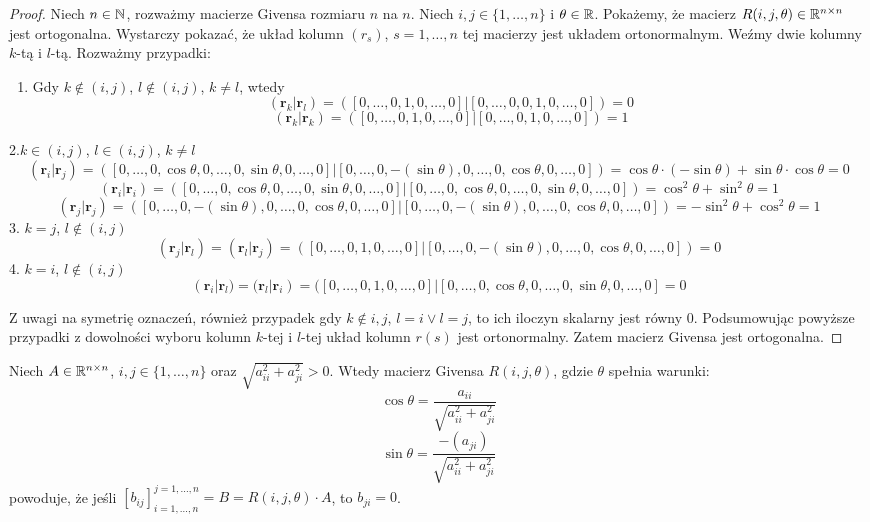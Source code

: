 \documentclass[12pt,a4paper]{report}
\newcommand{\vr}[1]{\mathbf{#1}}
\newcommand{\mx}[1]{{#1}}
\begin{document}
\begin{proof}
Niech $n\in \mathbb{N}$, rozważmy macierze Givensa rozmiaru $n$ na $n$. Niech $i,j \in \{1,\ldots, n\}$ i $\theta \in \mathbb{R}$. Pokażemy, że macierz $\mx{R}(i,j,\theta) \in \setR^{n\times n}$ jest ortogonalna.
Wystarczy pokazać, że układ kolumn $(r_s)$, $s=1,\ldots, n$ tej macierzy jest układem ortonormalnym. Weźmy dwie kolumny $k$-tą i $l$-tą. Rozważmy przypadki:
\begin{enumerate}
\item Gdy $k\notin (i,j)$, $l\notin (i,j)$, $k \neq l$, wtedy
$$
(\vr{r}_{k}|\vr{r}_{l}) = ([0,\ldots, 0,1,0,\ldots,0]|[0,\ldots,0,0,1,0,\ldots,0]) = 0
$$
$$
(\vr{r}_{k}|\vr{r}_{k}) = ([0,\ldots, 0,1,0,\ldots,0]|[0,\ldots,0,1,0,\ldots,0]) = 1
$$
\end{enumerate}

2.$k \in (i,j)$, $l \in (i,j)$, $k \neq l$
{\scriptsize
$$
(\vr{r}_{i}|\vr{r}_{j}) = ([0,\ldots, 0,\cos\theta,0,\ldots,0,\sin\theta,0,\ldots,0]|[0,\ldots, 0,-(\sin\theta),0,\ldots,0,\cos\theta,0,\ldots,0]) = \cos\theta\cdot(-\sin\theta) + \sin\theta\cdot\cos\theta = 0
$$
$$
(\vr{r}_{i}|\vr{r}_{i}) = ([0,\ldots, 0,\cos\theta,0,\ldots,0,\sin\theta,0,\ldots,0]|[0,\ldots, 0,\cos\theta,0,\ldots,0,\sin\theta,0,\ldots,0]) = \cos^{2}\theta + \sin^{2}\theta = 1
$$
$$
(\vr{r}_{j}|\vr{r}_{j}) = ([0,\ldots, 0,-(\sin\theta),0,\ldots,0,\cos\theta,0,\ldots,0]|[0,\ldots, 0,-(\sin\theta),0,\ldots,0,\cos\theta,0,\ldots,0]) = -\sin^{2}\theta + \cos^{2}\theta = 1
$$
}
3. $k=j$, $l\notin (i,j)$
$$
(\vr{r}_{j}|\vr{r}_{l}) = (\vr{r}_{l}|\vr{r}_{j})= ([0,\ldots, 0,1,0,\ldots,0]|[0,\ldots, 0,-(\sin\theta),0,\ldots,0,\cos\theta,0,\ldots,0]) = 0
$$
4. $k=i$, $l\notin(i,j)$
$$
(\vr{r}_{i}|\vr{r}_{l}) = (\vr{r}_{l}|\vr{r}_{i})= ([0,\ldots, 0,1,0,\ldots,0]|[0,\ldots, 0,\cos\theta,0,\ldots,0,\sin\theta,0,\ldots,0] = 0
$$

Z uwagi na symetrię oznaczeń, również przypadek gdy $k\notin{i,j}$, $l=i \lor l=j$, to ich iloczyn skalarny jest równy $0$. Podsumowując powyższe przypadki z dowolności wyboru kolumn $k$-tej i $l$-tej układ kolumn $r(s)$ jest ortonormalny. Zatem macierz Givensa jest ortogonalna.
\end{proof}

\begin{lemma}
Niech $\mx{A} \in \setR^{n \times n}$, $i,j \in \{1, \ldots, n\}$ oraz $\sqrt{a_{ii}^{2} + a_{ji}^{2}} > 0$. Wtedy macierz Givensa $\mx{R}(i,j, \theta)$, gdzie $\theta$ spełnia warunki:
$$
\cos\theta = \frac{a_{ii}}{\sqrt{a_{ii}^{2} + a_{ji}^{2}}}
$$
$$
\sin\theta = \frac{-(a_{ji})}{\sqrt{a_{ii}^{2} + a_{ji}^{2}}}
$$
powoduje, że jeśli $[b_{ij}]_{i=1,\ldots,n}^{j=1,\ldots,n} = \mx{B} = \mx{R}(i,j,\theta)\cdot \mx{A}$, to 
$b_{ji}=0$.
\end{lemma}
\end{document}
